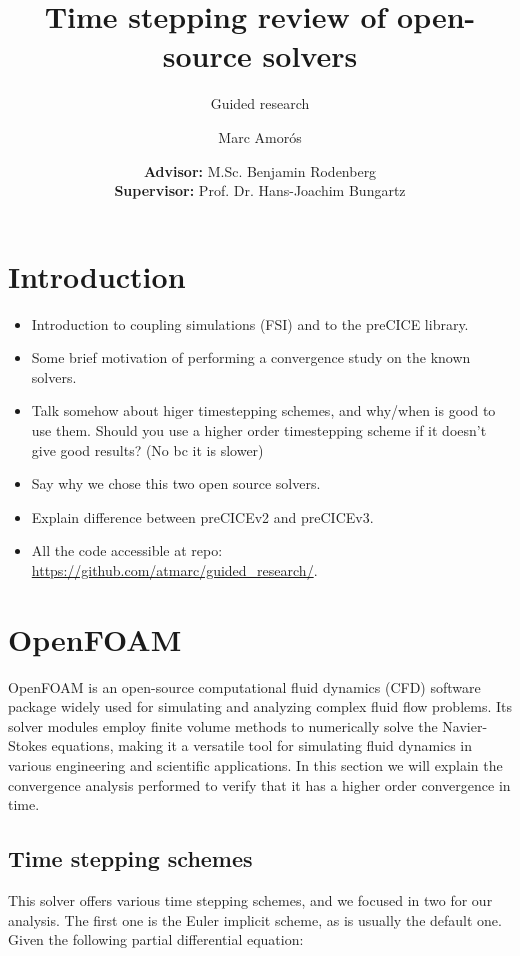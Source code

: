 \documentclass[
  english,        %
  font=times,     %
  onecolumn,      %
]{tumarticle}
\title{Time stepping review of open-source solvers}
\subtitle{Guided research}
\author[email=marc.amoros@tum.de]{Marc Amorós}
\date{
    \small
    \textbf{Advisor:} M.Sc. Benjamin Rodenberg \\
    \textbf{Supervisor:} Prof. Dr. Hans-Joachim Bungartz \\
}
\begin{document}
\maketitle


\section{Introduction}
\begin{itemize}
    \item Introduction to coupling simulations (FSI) and to the preCICE library. 
    \item Some brief motivation of performing a convergence study on the known solvers.
    \item Talk somehow about higer timestepping schemes, and why/when is good to use them. Should you use a higher order timestepping scheme if it doesn't give good results? (No bc it is slower) 
    \item Say why we chose this two open source solvers.
    \item Explain difference between preCICEv2 and preCICEv3.
    \item All the code accessible at repo: \url{https://github.com/atmarc/guided_research/}.
\end{itemize}


\section{OpenFOAM}

OpenFOAM is an open-source computational fluid dynamics (CFD) software package widely used for simulating and analyzing complex fluid flow problems. Its solver modules employ finite volume methods to numerically solve the Navier-Stokes equations, making it a versatile tool for simulating fluid dynamics in various engineering and scientific applications. In this section we will explain the convergence analysis performed to verify that it has a higher order convergence in time.   

\subsection{Time stepping schemes}
This solver offers various time stepping schemes, and we focused in two for our analysis. The first one is the Euler implicit scheme, as is usually the default one. Given the following partial differential equation:
\end{document}

